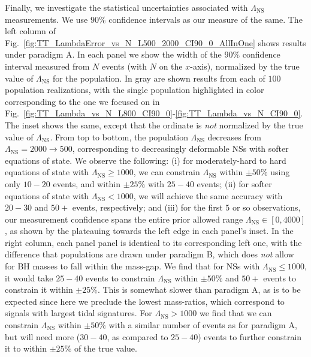\documentclass[aps,prd,amsmath,floats,floatfix, twocolumn,
superscriptaddress,nofootinbib,showpacs]{revtex4-1}
\newcommand{\lambdans}{\Lambda_\mathrm{NS}}
\begin{document}
Finally, we investigate the statistical uncertainties associated with
$\lambdans$ measurements. We use $90\%$ confidence intervals as our measure of
the same. The left column of 
Fig.~\ref{fig:TT_LambdaError_vs_N_L500_2000_CI90_0_AllInOne} shows results
under paradigm A. In each panel
we show the width of the $90\%$ confidence interval measured from $N$ events
(with $N$ on the $x$-axis), normalized by the true value of $\lambdans$ for
the population. In gray are shown results from each of $100$ population
realizations, with the single population highlighted in color corresponding
to the one we focused on in 
Fig.~\ref{fig:TT_Lambda_vs_N_L800_CI90_0}-\ref{fig:TT_Lambda_vs_N_CI90_0}.
The inset shows the same, except that the ordinate is {\it not} normalized by
the true value of $\lambdans$. From top to bottom, the population $\lambdans$
decreases from $\lambdans=2000\rightarrow 500$, corresponding to decreasingly
deformable NSs with softer equations of state. We observe the following:
(i) for moderately-hard to hard equations of state with $\lambdans\geq 1000$,
we can constrain $\lambdans$ within $\pm 50\%$ using only $10-20$ events, and
within $\pm 25\%$ with $25-40$ events; (ii) for softer equations of state with
$\lambdans<1000$, we will achieve the same accuracy with $20-30$ and $50+$ 
events, respectively; and (iii) for the first $5$ or so observations, our
measurement confidence spans the entire prior allowed range 
$\lambdans\in[0,4000]$, as shown by the plateauing towards the left edge in
each panel's inset.
% 
In the right column, each panel panel is identical to its corresponding left
one, with the difference that populations are drawn under paradigm B, which
does {\it not} allow for BH masses to fall within the mass-gap. We find that
for NSs with $\lambdans\leq 1000$, it would take $25-40$ events to
constrain $\lambdans$ within $\pm 50\%$ and $50+$ events to constrain it
within $\pm 25\%$. This is somewhat slower than paradigm A, as is to be
expected since here we preclude the lowest mass-ratios, which correspond to
signals with largest tidal signatures. For $\lambdans>1000$ we find that we
can constrain $\lambdans$ within $\pm 50\%$ with a similar number of events as
for paradigm A, but will need more ($30-40$, as compared to $25-40$) events
to further constrain it to within $\pm 25\%$ of the true value.
% 
\end{document}
